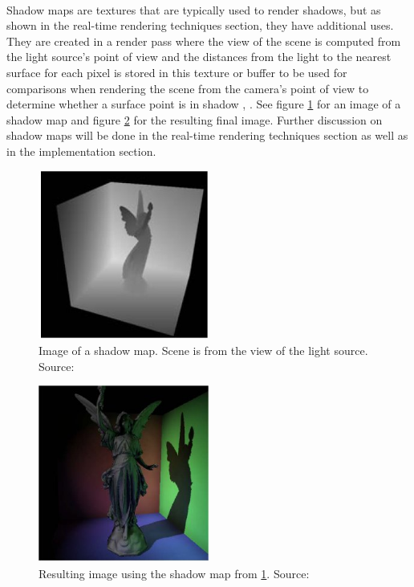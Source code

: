 \paragraph{}
Shadow maps are textures that are typically used to render shadows, but as shown in the real-time rendering techniques section, they have additional uses.  They are created in a render pass where the view of the scene is computed from the light source's point of view and the distances from the light to the nearest surface for each pixel is stored in this texture or buffer to be used for comparisons when rendering the scene from the camera's point of view to determine whether a surface point is in shadow \cite{Williams1978}, \cite{Reeves1987}.  See figure \ref{fig:shadowMap1} for an image of a shadow map and figure \ref{fig:shadowMap2} for the resulting final image.  Further discussion on shadow maps will be done in the real-time rendering techniques section as well as in the implementation section.
\begin{figure}[h!]
  \centering
    \includegraphics[width=0.5\textwidth]{shadowMap1.jpg}
  \caption{Image of a shadow map. Scene is from the view of the light source. Source: \protect\cite{Dachsbacher2005}}
	\label{fig:shadowMap1}
\end{figure}
\begin{figure}[h!]
  \centering
    \includegraphics[width=0.5\textwidth]{shadowMap2.jpg}
  \caption{Resulting image using the shadow map from \ref{fig:shadowMap1}. Source: \protect\cite{Dachsbacher2005}}
	\label{fig:shadowMap2}
\end{figure}
